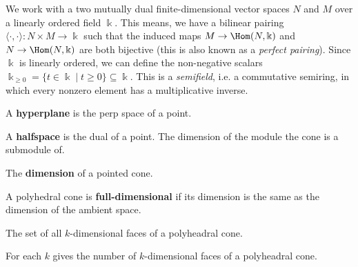 
%





We work with a two mutually dual finite-dimensional vector spaces \( N
\) and \( M \) over a linearly ordered field \( \Bbbk \). This means,
we have a bilinear pairing \( \langle \cdot, \cdot \rangle \colon N
\times M \to \Bbbk \) such that the induced maps \( M \to
\Hom(N,\Bbbk) \) and \( N \to \Hom(N,\Bbbk) \) are both bijective
(this is also known as a \emph{perfect pairing}). Since \( \Bbbk \) is
linearly ordered, we can define the non-negative scalars \(\Bbbk_{\geq
0} = \{t \in \Bbbk \mid t \geq 0 \} \subseteq \Bbbk\). This is a
\emph{semifield}, i.e. a commutative semiring, in which every nonzero
element has a multiplicative inverse.




\begin{definition}
  \label{names}
  A {\bf hyperplane} is the perp space of a point.

  A {\bf halfspace} is the dual of a point.
  The dimension of the module the cone is a submodule of.

  The {\bf dimension} of a pointed cone.

  A polyhedral cone is {\bf full-dimensional} if its dimension is the same as the dimension of the ambient space.

  The set of all \(k\)-dimensional faces of a polyheadral cone.

  For each \(k\) gives the number of \(k\)-dimensional faces of a polyheadral cone.
\end{definition}


